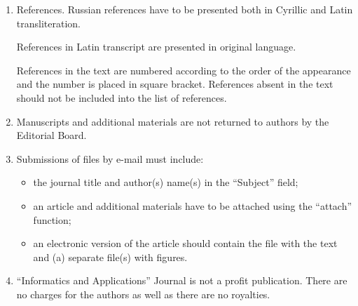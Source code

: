 {\begin{enumerate}[1.]
\begin{itemize}
{\sf 
http://www.ipiran.ru/journal/issues/2013\_07\_01\_eng/authors.asp};

\item abstract (not less than 100~words) both in Russian and in English. Abstract is a short 
summary of the article that can be published separately from the article. The abstract is 
the main source of information on the article and it could be included in leading information 
systems and data bases. The abstract in English has to be an original text and should not be 
an exact translation of the Russian one. Good English is required;

\pagebreak

\thispagestyle{empty}

\vspace*{-36pt}


\item indexing is performed on the basis of key words. The use of key words from the internationally 
accepted thematic Thesauri is recommended. 

Important! Key words must not be sentences.
\end{itemize}

\item References. Russian references have to be presented both in Cyrillic and Latin transliteration. 

References in Latin transcript are presented in original language.

References in the text are numbered according to the order of the appearance 
and the number is placed in square bracket. References absent in the text should not 
be included into the list of references.
 

\item Manuscripts and additional materials are not returned to authors by the Editorial Board. 

\item Submissions of files by e-mail must include: 
\begin{itemize}
\item  the journal title and author(s) name(s) in the ``Subject'' field; 
\item  an article and additional materials have to be attached using the ``attach'' function;
\item  an electronic version of the article should contain the file with the text and (a) 
separate file(s) with figures. 
\end{itemize}
\item  ``Informatics and Applications'' Journal is not a profit publication. There are no charges 
for the authors as well as there are no royalties.
\end{enumerate}

}
